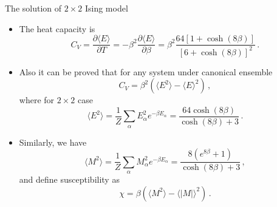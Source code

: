 \documentclass{beamer}
\begin{document}
\begin{frame}{The solution of $2\times 2$ Ising model}
\begin{itemize}
	\item<1-> 	The heat capacity is 
	\begin{equation}\label{eq:cv}
	C_V=\frac{\partial \langle E\rangle}{\partial T}=-\beta^2\frac{\partial \langle E\rangle}{\partial \beta}
	=\beta^2\frac{64\left[1+\cosh\left(8\beta\right)\right]}{\left[6+\cosh\left(8\beta\right)\right]^2}
	\,. 
	\end{equation}
	\item<2-> Also it can be proved that for any system under canonical ensemble 
	\begin{equation}
	C_V=\beta^2\left(\langle E^2\rangle-\langle E\rangle^2\right)\,,
	\end{equation}
	where for $2\times 2$ case 
	\begin{equation}
	\langle E^2\rangle=\frac{1}{Z}\sum_{\alpha}E^2_\alpha e^{-\beta E_\alpha}=\frac{64\cosh\left(8\beta\right)}{\cosh\left(8\beta\right)+3}\,. 
	\end{equation}
	\item<2-> 
	Similarly, we have 
	\begin{equation}
	\langle M^2\rangle=\frac{1}{Z}\sum_{\alpha} M^2_\alpha e^{-\beta E_\alpha}=\frac{8\left(e^{8\beta}+1\right)}{\cosh\left(8\beta\right)+3}\,, 
	\end{equation}
	and define susceptibility as 
	\begin{equation}\label{eq:chi}
	\chi=\beta\left(\langle M^2\rangle -\langle |M|\rangle ^2\right)\,. 
	\end{equation}
\end{itemize}
\end{frame}
\end{document}
